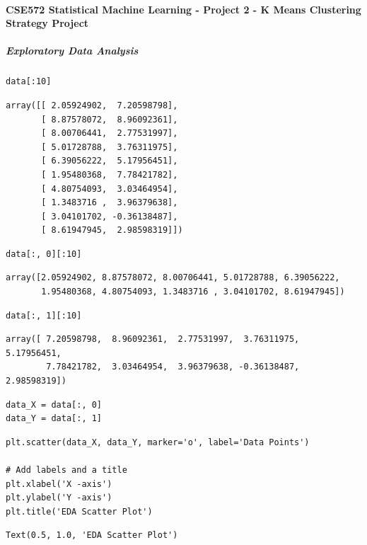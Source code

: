 \paragraph{CSE572 Statistical Machine Learning - Project 2 - K Means Clustering Strategy Project}

\subparagraph{Exploratory Data Analysis}

\begin{verbatim}
data[:10]
\end{verbatim}

\begin{verbatim}
array([[ 2.05924902,  7.20598798],
       [ 8.87578072,  8.96092361],
       [ 8.00706441,  2.77531997],
       [ 5.01728788,  3.76311975],
       [ 6.39056222,  5.17956451],
       [ 1.95480368,  7.78421782],
       [ 4.80754093,  3.03464954],
       [ 1.3483716 ,  3.96379638],
       [ 3.04101702, -0.36138487],
       [ 8.61947945,  2.98598319]])
\end{verbatim}

\begin{verbatim}
data[:, 0][:10]
\end{verbatim}

\begin{verbatim}
array([2.05924902, 8.87578072, 8.00706441, 5.01728788, 6.39056222,
       1.95480368, 4.80754093, 1.3483716 , 3.04101702, 8.61947945])
\end{verbatim}

\begin{verbatim}
data[:, 1][:10]
\end{verbatim}

\begin{verbatim}
array([ 7.20598798,  8.96092361,  2.77531997,  3.76311975,  5.17956451,
        7.78421782,  3.03464954,  3.96379638, -0.36138487,  2.98598319])
\end{verbatim}

\begin{verbatim}
data_X = data[:, 0]
data_Y = data[:, 1]
\end{verbatim}

\begin{verbatim}
plt.scatter(data_X, data_Y, marker='o', label='Data Points')

# Add labels and a title
plt.xlabel('X -axis')
plt.ylabel('Y -axis')
plt.title('EDA Scatter Plot')
\end{verbatim}

\begin{verbatim}
Text(0.5, 1.0, 'EDA Scatter Plot')
\end{verbatim}

